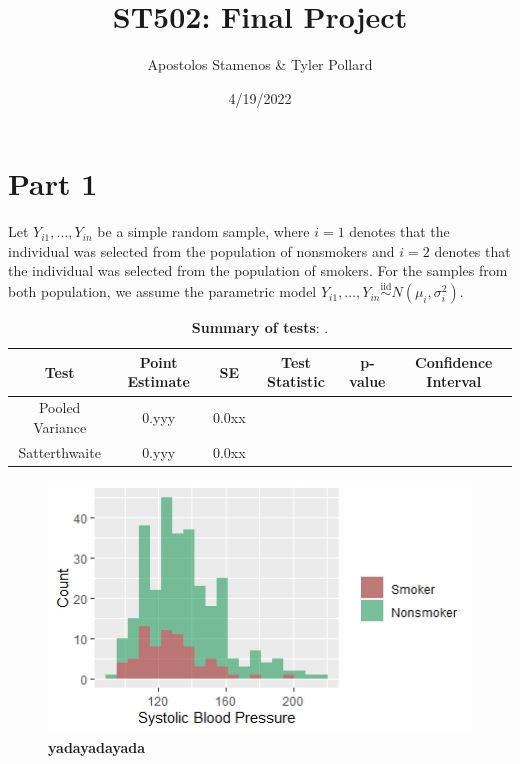 \documentclass[]{article}
\title{\vspace{7cm} \LARGE ST502: Final Project}
\author{Apostolos Stamenos \& Tyler Pollard}
\date{4/19/2022}
\begin{document}
\maketitle

\newpage

\section{Part 1}\label{s:part1}

Let \(Y_{i1}, \dots, Y_{in}\) be a simple random sample, where \(i=1\)
denotes that the individual was selected from the population of
nonsmokers and \(i=2\) denotes that the individual was selected from the
population of smokers. For the samples from both population, we assume
the parametric model
\(Y_{i1}, \dots, Y_{in} \overset{\text{iid}}\sim N\left(\mu_i, \sigma_i^2\right)\).

\begin{table}[H]\begin{center}
\caption{{\bf Summary of tests}: .}\label{t:summary}
\begin{tabular}{c|cc|cc|c} \hline
Test & Point Estimate & SE & Test Statistic & p-value & Confidence Interval\\ \hline
Pooled Variance & 0.yyy & 0.0xx & & & \\
Satterthwaite & 0.yyy & 0.0xx & & & \\ \hline
\end{tabular}
\end{center}
\end{table}

\begin{figure}\caption{{\bf yadayadayada}\label{f:hist}}
\centering 
\includegraphics[page=1,width=1.05\textwidth]{hist}
\end{figure}
\end{document}
